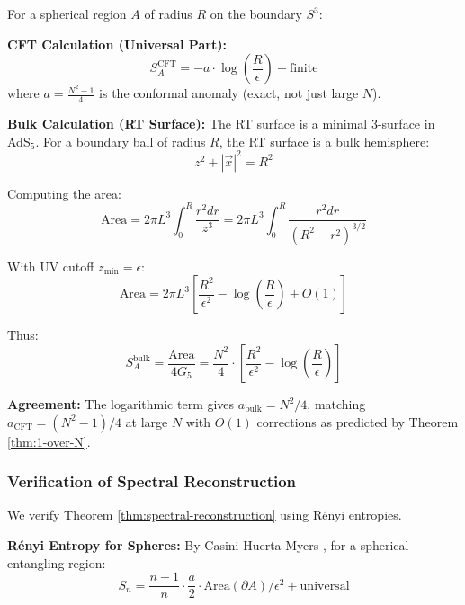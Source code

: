 \documentclass[12pt,a4paper]{article}
\begin{document}
For a spherical region $A$ of radius $R$ on the boundary $S^3$:

\textbf{CFT Calculation (Universal Part):}
\begin{equation}
S_A^{\text{CFT}} = -a \cdot \log\left(\frac{R}{\epsilon}\right) + \text{finite}
\end{equation}
where $a = \frac{N^2 - 1}{4}$ is the conformal anomaly (exact, not just large $N$).

\textbf{Bulk Calculation (RT Surface):}
The RT surface is a minimal 3-surface in AdS$_5$. For a boundary ball of radius $R$, the RT surface is a bulk hemisphere:
\begin{equation}
z^2 + |\vec{x}|^2 = R^2
\end{equation}

Computing the area:
\begin{equation}
\text{Area} = 2\pi L^3 \int_0^R \frac{r^2 dr}{z^3} = 2\pi L^3 \int_0^R \frac{r^2 dr}{(R^2 - r^2)^{3/2}}
\end{equation}

With UV cutoff $z_{\min} = \epsilon$:
\begin{equation}
\text{Area} = 2\pi L^3 \left[ \frac{R^2}{\epsilon^2} - \log\left(\frac{R}{\epsilon}\right) + O(1) \right]
\end{equation}

Thus:
\begin{equation}
S_A^{\text{bulk}} = \frac{\text{Area}}{4G_5} = \frac{N^2}{4} \cdot \left[ \frac{R^2}{\epsilon^2} - \log\left(\frac{R}{\epsilon}\right) \right]
\end{equation}

\textbf{Agreement:} The logarithmic term gives $a_{\text{bulk}} = N^2/4$, matching $a_{\text{CFT}} = (N^2-1)/4$ at large $N$ with $O(1)$ corrections as predicted by Theorem \ref{thm:1-over-N}.

\subsubsection{Verification of Spectral Reconstruction}

We verify Theorem \ref{thm:spectral-reconstruction} using R\'enyi entropies.

\textbf{R\'enyi Entropy for Spheres:}
By Casini-Huerta-Myers \cite{casini2011}, for a spherical entangling region:
\begin{equation}
S_n = \frac{n+1}{n} \cdot \frac{a}{2} \cdot \text{Area}(\partial A)/\epsilon^2 + \text{universal}
\end{equation}
\end{document}
